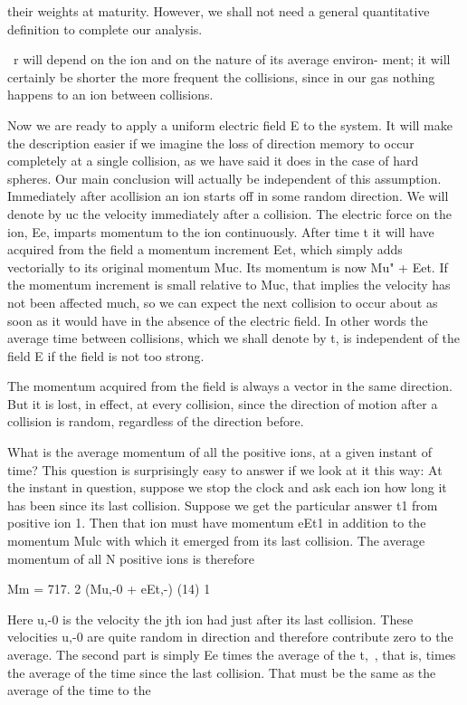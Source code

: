their weights at maturity. However, we shall not need a general quantitative definition
to complete our analysis.

~r will depend on the ion and on the nature of its average environ-
ment; it will certainly be shorter the more frequent the collisions,
since in our gas nothing happens to an ion between collisions.

Now we are ready to apply a uniform electric field E to the system.
It will make the description easier if we imagine the loss of direction
memory to occur completely at a single collision, as we have said it
does in the case of hard spheres. Our main conclusion will actually
be independent of this assumption. Immediately after acollision
an ion starts off in some random direction. We will denote by uc
the velocity immediately after a collision. The electric force on the
ion, Ee, imparts momentum to the ion continuously. After time t
it will have acquired from the field a momentum increment Eet,
which simply adds vectorially to its original momentum Muc. Its
momentum is now Mu" + Eet. If the momentum increment is small
relative to Muc, that implies the velocity has not been affected much,
so we can expect the next collision to occur about as soon as it would
have in the absence of the electric field. In other words the average
time between collisions, which we shall denote by t, is independent
of the field E if the field is not too strong.

The momentum acquired from the field is always a vector in the
same direction. But it is lost, in effect, at every collision, since the
direction of motion after a collision is random, regardless of the
direction before.

What is the average momentum of all the positive ions, at a given
instant of time? This question is surprisingly easy to answer if we
look at it this way: At the instant in question, suppose we stop the
clock and ask each ion how long it has been since its last collision.
Suppose we get the particular answer t1 from positive ion 1. Then
that ion must have momentum eEt1 in addition to the momentum
Mulc with which it emerged from its last collision. The average
momentum of all N positive ions is therefore

Mm = 717. 2 (Mu,-0 + eEt,-) (14)
1
\begin{equation}
\end{equation}

Here u,-0 is the velocity the jth ion had just after its last collision.
These velocities u,-0 are quite random in direction and therefore contribute
zero to the average. The second part is simply Ee times the
average of the t,~, that is, times the average of the time since the last
collision. That must be the same as the average of the time to the

